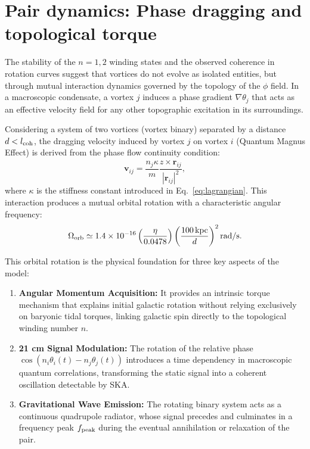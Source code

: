 \documentclass[11pt,a4paper]{article}
\begin{document}
\section{Pair dynamics: Phase dragging and topological torque}

The stability of the $n=1, 2$ winding states and the observed coherence in rotation curves suggest that vortices do not evolve as isolated entities, but through mutual interaction dynamics governed by the topology of the $\phi$ field. In a macroscopic condensate, a vortex $j$ induces a phase gradient $\nabla \theta_j$ that acts as an effective velocity field for any other topographic excitation in its surroundings.

Considering a system of two vortices (vortex binary) separated by a distance $d < l_{\rm coh}$, the dragging velocity induced by vortex $j$ on vortex $i$ (Quantum Magnus Effect) is derived from the phase flow continuity condition:
\begin{equation}
	\mathbf{v}_{ij} = \frac{n_j \kappa}{m} \frac{\hat{z} \times \mathbf{r}_{ij}}{|\mathbf{r}_{ij}|^2},
\end{equation}
where $\kappa$ is the stiffness constant introduced in Eq.~\eqref{eq:lagrangian}. This interaction produces a mutual orbital rotation with a characteristic angular frequency:
\begin{equation}
	\Omega_{\rm orb} \simeq 1.4 \times 10^{-16} \left( \frac{\eta}{0.0478} \right) \left( \frac{100\,\text{kpc}}{d} \right)^2 \text{rad/s}.
\end{equation}

This orbital rotation is the physical foundation for three key aspects of the model:
\begin{enumerate}
	\item \textbf{Angular Momentum Acquisition:} It provides an intrinsic torque mechanism that explains initial galactic rotation without relying exclusively on baryonic tidal torques, linking galactic spin directly to the topological winding number $n$.
	\item \textbf{21 cm Signal Modulation:} The rotation of the relative phase $\cos(n_i\theta_i(t) - n_j\theta_j(t))$ introduces a time dependency in macroscopic quantum correlations, transforming the static signal into a coherent oscillation detectable by SKA.
	\item \textbf{Gravitational Wave Emission:} The rotating binary system acts as a continuous quadrupole radiator, whose signal precedes and culminates in a frequency peak $f_{\rm peak}$ during the eventual annihilation or relaxation of the pair.
	
\end{enumerate}
\end{document}

